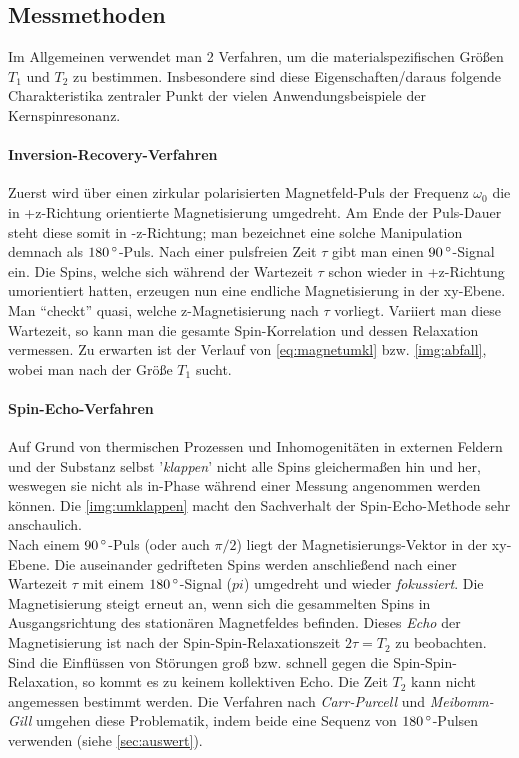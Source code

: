 \documentclass[numbers=noenddot,a4paper,notitlepage,twoside,BCOR15mm]{scrartcl}
\newcommand{\degree}{^\circ}
\newcommand{\ix}[1]{_\text{#1}}
\newcommand{\tilt}[1]{\textit{#1}}
\begin{document}
		\subsection{Messmethoden}\label{subsec:meth}

			Im Allgemeinen verwendet man 2 Verfahren, um die materialspezifischen Größen $T\ix{1}$ und $T\ix{2}$ zu bestimmen. Insbesondere sind diese Eigenschaften/daraus folgende Charakteristika zentraler Punkt der vielen Anwendungsbeispiele der Kernspinresonanz.
			\paragraph{Inversion-Recovery-Verfahren}
				Zuerst wird über einen zirkular polarisierten Magnetfeld-Puls der Frequenz $\omega\ix{0}$ die in +z-Richtung orientierte Magnetisierung umgedreht. Am Ende der Puls-Dauer steht diese somit in -z-Richtung; man bezeichnet eine solche Manipulation demnach als $\unit[180]{\degree}$-Puls. Nach einer pulsfreien Zeit $\tau$ gibt man einen $\unit[90]{\degree}$-Signal ein. Die Spins, welche sich während der Wartezeit $\tau$ schon wieder in +z-Richtung umorientiert hatten, erzeugen nun eine endliche Magnetisierung in der xy-Ebene. Man "`checkt"' quasi, welche z-Magnetisierung nach $\tau$ vorliegt. Variiert man diese Wartezeit, so kann man die gesamte Spin-Korrelation und dessen Relaxation vermessen. Zu erwarten ist der Verlauf von \autoref{eq:magnetumkl} bzw. \autoref{img:abfall}, wobei man nach der Größe $T\ix{1}$ sucht.
			\paragraph{Spin-Echo-Verfahren}
				Auf Grund von thermischen Prozessen und Inhomogenitäten in externen Feldern und der Substanz selbst '\tilt{klappen}' nicht alle Spins gleichermaßen hin und her, weswegen sie nicht als in-Phase während einer Messung angenommen werden können. Die \autoref{img:umklappen} macht den Sachverhalt der Spin-Echo-Methode sehr anschaulich.\\
				Nach einem $\unit[90]{\degree}$-Puls (oder auch $\pi/2$) liegt der Magnetisierungs-Vektor in der xy-Ebene. Die auseinander gedrifteten Spins werden anschließend nach einer Wartezeit $\tau$ mit einem $\unit[180]{\degree}$-Signal ($pi$) umgedreht und wieder \tilt{fokussiert}. Die Magnetisierung steigt erneut an, wenn sich die gesammelten Spins in Ausgangsrichtung des stationären Magnetfeldes befinden. Dieses \tilt{Echo} der Magnetisierung ist nach der Spin-Spin-Relaxationszeit $2\tau=T\ix{2}$ zu beobachten.\\
				Sind die Einflüssen von Störungen groß bzw. schnell gegen die Spin-Spin-Relaxation, so kommt es zu keinem kollektiven Echo. Die Zeit $T\ix{2}$ kann nicht angemessen bestimmt werden. Die Verfahren nach \tilt{Carr-Purcell} und \tilt{Meibomm-Gill} umgehen diese Problematik, indem beide eine Sequenz von $\unit[180]{\degree}$-Pulsen verwenden (siehe \autoref{sec:auswert}).
\end{document}

